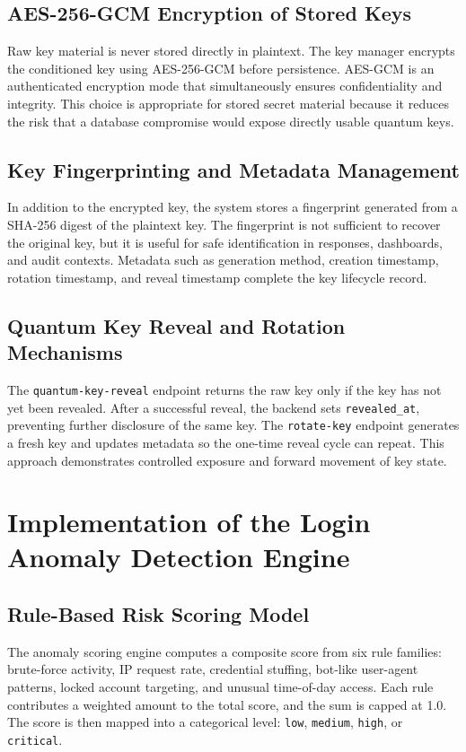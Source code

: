 \documentclass[12pt,a4paper]{report}
\begin{document}
\subsection{AES-256-GCM Encryption of Stored Keys}
Raw key material is never stored directly in plaintext. The key manager encrypts the conditioned key using AES-256-GCM before persistence. AES-GCM is an authenticated encryption mode that simultaneously ensures confidentiality and integrity. This choice is appropriate for stored secret material because it reduces the risk that a database compromise would expose directly usable quantum keys.

\subsection{Key Fingerprinting and Metadata Management}
In addition to the encrypted key, the system stores a fingerprint generated from a SHA-256 digest of the plaintext key. The fingerprint is not sufficient to recover the original key, but it is useful for safe identification in responses, dashboards, and audit contexts. Metadata such as generation method, creation timestamp, rotation timestamp, and reveal timestamp complete the key lifecycle record.

\subsection{Quantum Key Reveal and Rotation Mechanisms}
The \texttt{quantum-key-reveal} endpoint returns the raw key only if the key has not yet been revealed. After a successful reveal, the backend sets \texttt{revealed\_at}, preventing further disclosure of the same key. The \texttt{rotate-key} endpoint generates a fresh key and updates metadata so the one-time reveal cycle can repeat. This approach demonstrates controlled exposure and forward movement of key state.

\section{Implementation of the Login Anomaly Detection Engine}

\subsection{Rule-Based Risk Scoring Model}
The anomaly scoring engine computes a composite score from six rule families: brute-force activity, IP request rate, credential stuffing, bot-like user-agent patterns, locked account targeting, and unusual time-of-day access. Each rule contributes a weighted amount to the total score, and the sum is capped at 1.0. The score is then mapped into a categorical level: \texttt{low}, \texttt{medium}, \texttt{high}, or \texttt{critical}.
\end{document}
